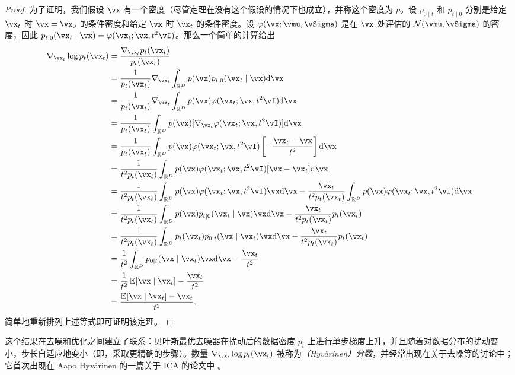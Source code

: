 \documentclass[../../book-main_zh.tex]{subfiles}
\begin{document}
\begin{proof}
	为了证明，我们假设 \(\vx\) 有一个密度（尽管定理在没有这个假设的情况下也成立），并称这个密度为 \(p\)。设 \(p_{0 \mid t}\) 和 \(p_{t \mid 0}\) 分别是给定 \(\vx_{t}\) 时 \(\vx = \vx_{0}\) 的条件密度和给定 \(\vx\) 时 \(\vx_{t}\) 的条件密度。设 \(\phi(\vx ; \vmu, \vSigma)\) 是在 \(\vx\) 处评估的 \(\dNorm(\vmu, \vSigma)\) 的密度，因此 \(p_{t \mid 0}(\vx_{t} \mid \vx) = \phi(\vx_{t} ; \vx, t^{2}\vI)\)。那么一个简单的计算给出
	\begin{align}
		\nabla_{\vx_{t}} \log p_{t}(\vx_{t})
		&= \frac{\nabla_{\vx_{t}}p_{t}(\vx_{t})}{p_{t}(\vx_{t})} \\
		&= \frac{1}{p_{t}(\vx_{t})}\nabla_{\vx_{t}}\int_{\R^{D}}p(\vx)p_{t \mid 0}(\vx_{t} \mid \vx)\odif{\vx} \\
		&=
		\frac{1}{p_{t}(\vx_{t})}\nabla_{\vx_{t}}\int_{\R^{D}}p(\vx)\phi(\vx_{t}
		;\vx, t^{2}\vI)\odif{\vx} \\
		&=
		\frac{1}{p_{t}(\vx_{t})}\int_{\R^{D}}p(\vx)[\nabla_{\vx_{t}}\phi(\vx_{t}
		;\vx, t^{2}\vI)]\odif{\vx} \\
		&= \frac{1}{p_{t}(\vx_{t})}\int_{\R^{D}}p(\vx)\phi(\vx_{t} ; \vx, t^{2}\vI)\bs{-\frac{\vx_{t} - \vx}{t^{2}}}\odif{\vx} \\
		&= \frac{1}{t^{2}p_{t}(\vx_{t})}\int_{\R^{D}}p(\vx)\phi(\vx_{t} ; \vx, t^{2}\vI)[\vx - \vx_{t}]\odif{\vx} \\
		&= \frac{1}{t^{2}p_{t}(\vx_{t})}\int_{\R^{D}}p(\vx)\phi(\vx_{t} ; \vx,
		t^{2}\vI)\vx \odif{\vx}
		- \frac{\vx_{t}}{t^{2}p_{t}(\vx_{t})}\int_{\R^{D}}p(\vx)\phi(\vx_{t} ; \vx, t^{2}\vI)\odif{\vx} \\
		&= \frac{1}{t^{2}p_{t}(\vx_{t})}\int_{\R^{D}}p(\vx)p_{t \mid 0}(\vx_{t} \mid \vx)\vx \odif{\vx} - \frac{\vx_{t}}{t^{2}p_{t}(\vx_{t})}p_{t}(\vx_{t}) \\
		&= \frac{1}{t^{2}p_{t}(\vx_{t})}\int_{\R^{D}}p_{t}(\vx_{t})p_{0 \mid t}(\vx \mid \vx_{t})\vx \odif{\vx} - \frac{\vx_{t}}{t^{2}p_{t}(\vx_{t})}p_{t}(\vx_{t}) \\
		&= \frac{1}{t^{2}}\int_{\R^{D}}p_{0 \mid t}(\vx \mid \vx_{t})\vx \odif{\vx} - \frac{\vx_{t}}{t^{2}} \\
		&= \frac{1}{t^{2}}\Ex[\vx \mid \vx_{t}] - \frac{\vx_{t}}{t^{2}} \\
		&= \frac{\Ex[\vx \mid \vx_{t}] - \vx_{t}}{t^{2}}.
	\end{align}
	简单地重新排列上述等式即可证明该定理。
\end{proof}
这个结果在去噪和优化之间建立了联系：贝叶斯最优去噪器在扰动后的数据密度 \(p_{t}\) 上进行单步梯度上升，并且随着对数据分布的扰动变小，步长自适应地变小（即，采取更精确的步骤）。数量 \(\nabla_{\vx_{t}}\log p_{t}(\vx_{t})\) 被称为\textit{（Hyv\"arinen）分数}，并经常出现在关于去噪等的讨论中；它首次出现在 Aapo Hyv\"arinen 的一篇关于 ICA 的论文中 \cite{hyvarinen05a}。
\end{document}

